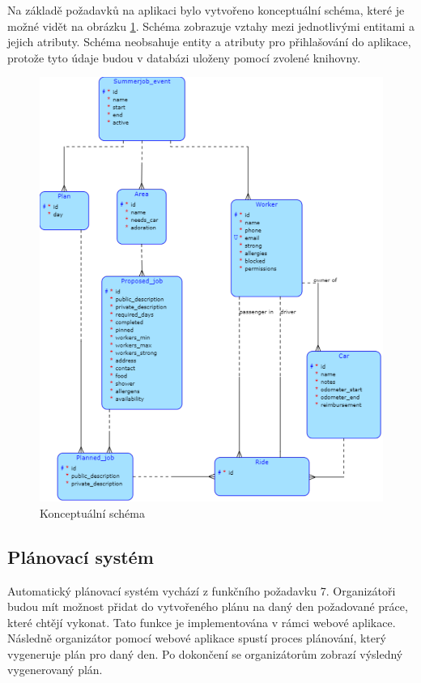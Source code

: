 Na základě požadavků na aplikaci bylo vytvořeno konceptuální schéma, které je možné vidět na obrázku \ref{fig:schema}. Schéma zobrazuje vztahy mezi jednotlivými entitami a jejich atributy.
Schéma neobsahuje entity a atributy pro přihlašování do aplikace, protože tyto údaje budou v databázi uloženy pomocí zvolené knihovny.

\begin{figure}[ht]
    \centering
    \includegraphics[width=\textwidth]{chapters/images/schema}
    \caption{Konceptuální schéma}
    \label{fig:schema}
\end{figure}


\subsection{Plánovací systém}

Automatický plánovací systém vychází z funkčního požadavku 7. Organizátoři budou mít možnost přidat do vytvořeného plánu na daný den požadované práce, které
chtějí vykonat. Tato funkce je implementována v rámci webové aplikace. Následně organizátor pomocí webové aplikace spustí proces plánování, který vygeneruje plán pro
daný den. Po dokončení se organizátorům zobrazí výsledný vygenerovaný plán.

